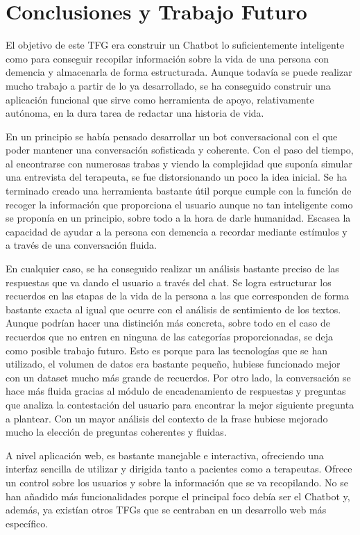 \chapter{Conclusiones y Trabajo Futuro}
\label{cap:conclusiones}

El objetivo de este TFG era construir un Chatbot lo suficientemente inteligente como para conseguir recopilar información sobre la vida de una persona con demencia y almacenarla de forma estructurada. Aunque todavía se puede realizar mucho trabajo a partir de lo ya desarrollado, se ha conseguido construir una aplicación funcional que sirve como herramienta de apoyo, relativamente autónoma, en la dura tarea de redactar una historia de vida. 

En un principio se había pensado desarrollar un bot conversacional con el que poder mantener una conversación sofisticada y coherente. Con el paso del tiempo, al encontrarse con numerosas trabas y viendo la complejidad que suponía simular una entrevista del terapeuta, se fue distorsionando un poco la idea inicial. Se ha terminado creado una herramienta bastante útil porque cumple con la función de recoger la información que proporciona el usuario aunque no tan inteligente como se proponía en un principio, sobre todo a la hora de darle humanidad. Escasea la capacidad de ayudar a la persona con demencia a recordar mediante estímulos y a través de una conversación fluida. 

En cualquier caso, se ha conseguido realizar un análisis bastante preciso de las respuestas que va dando el usuario a través del chat. Se logra estructurar los recuerdos en las etapas de la vida de la persona a las que corresponden de forma bastante exacta al igual que ocurre con el análisis de sentimiento de los textos. Aunque podrían hacer una distinción más concreta, sobre todo en el caso de recuerdos que no entren en ninguna de las categorías proporcionadas, se deja como posible trabajo futuro. Esto es porque para las tecnologías que se han utilizado, el volumen de datos era bastante pequeño, hubiese funcionado mejor con un dataset mucho más grande de recuerdos. Por otro lado, la conversación se hace más fluida gracias al módulo de encadenamiento de respuestas y preguntas que analiza la contestación del usuario para encontrar la mejor siguiente pregunta a plantear. Con un mayor análisis del contexto de la frase hubiese mejorado mucho la elección de preguntas coherentes y fluidas.

A nivel aplicación web, es bastante manejable e interactiva, ofreciendo una interfaz sencilla de utilizar y  dirigida tanto a pacientes como a terapeutas. Ofrece un control sobre los usuarios y sobre la información que se va recopilando. No se han añadido más funcionalidades porque el principal foco debía ser el Chatbot y, además, ya existían otros TFGs que se centraban en un desarrollo web más específico. 


